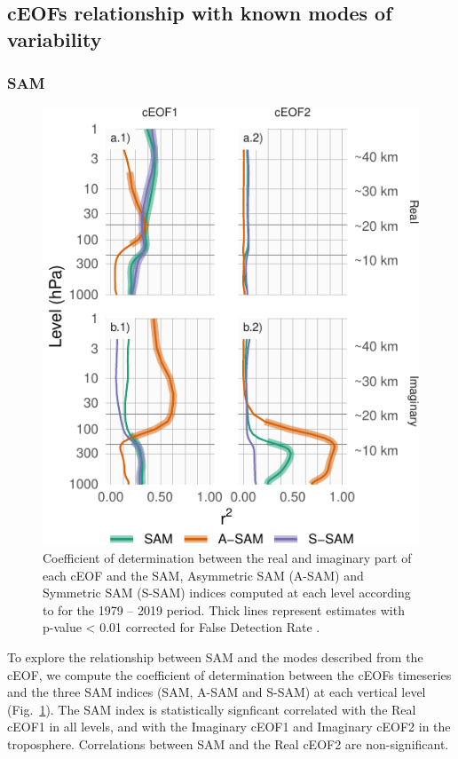 \documentclass[smallextended]{svjour3}       %
\begin{document}
\hypertarget{other-variables}{%
\subsection{cEOFs relationship with known modes of variability}\label{other-variables}}

\hypertarget{sam}{%
\subsubsection{SAM}\label{sam}}



\begin{figure}
\centering
\includegraphics{../figures/sam-eof-vertical-1.pdf}
\caption{\label{fig:sam-eof-vertical}Coefficient of determination between the real and imaginary part of each cEOF and the SAM, Asymmetric SAM (A-SAM) and Symmetric SAM (S-SAM) indices computed at each level according to \citet{campitelli2021} for the 1979 -- 2019 period. Thick lines represent estimates with p-value \textless{} 0.01 corrected for False Detection Rate \citep{benjamini1995}.}
\end{figure}

To explore the relationship between SAM and the modes described from the cEOF, we compute the coefficient of determination between the cEOFs timeseries and the three SAM indices (SAM, A-SAM and S-SAM) at each vertical level (Fig.~\ref{fig:sam-eof-vertical}).
The SAM index is statistically signficant correlated with the Real cEOF1 in all levels, and with the Imaginary cEOF1 and Imaginary cEOF2 in the troposphere.
Correlations between SAM and the Real cEOF2 are non-significant.
\end{document}
